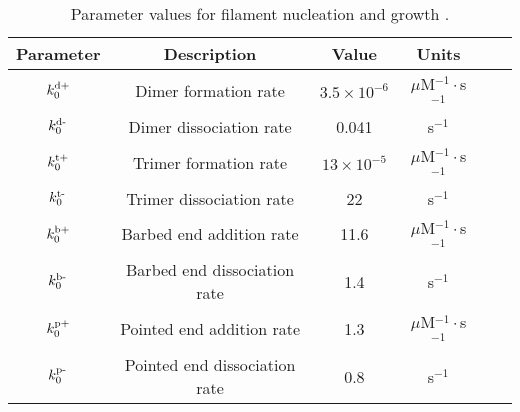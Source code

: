 \documentclass[11pt]{article}
\begin{document}
\begin{table}
\begin{center}
\begin{tabular}{|c|c|c|c|c|c|}\hline
Parameter & Description & Value & Units \\ \hline
$k^\text{d+}_0$ & Dimer formation rate& $3.5 \times 10^{-6}$ & $\mu$M$^{-1}\cdot$s$^{-1}$  \\ 
$k^\text{d-}_0$ & Dimer dissociation rate & 0.041 & s$^{-1}$\\
$k^\text{t+}_0$ & Trimer formation rate& $13 \times 10^{-5}$ & $\mu$M$^{-1}\cdot$s$^{-1}$  \\ 
$k^\text{t-}_0$ & Trimer dissociation rate & 22 & s$^{-1}$ \\
$k^\text{b+}_0$ & Barbed end addition rate& 11.6 & $\mu$M$^{-1}\cdot$s$^{-1}$ \\ 
$k^\text{b-}_0$ & Barbed end dissociation rate & 1.4 & s$^{-1}$\\
$k^\text{p+}_0$ & Pointed end addition rate& 1.3& $\mu$M$^{-1}\cdot$s$^{-1}$  \\ 
$k^\text{p-}_0$ & Pointed end dissociation rate & 0.8 & s$^{-1}$ \\ \hline
\end{tabular}
\caption{\label{tab:params} Parameter values for filament nucleation and growth \cite{rosenbloom2021mechanism}. }
\end{center}
\end{table}

\end{document}
